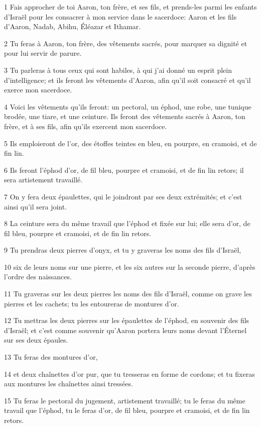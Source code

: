 \par 1 Fais approcher de toi Aaron, ton frère, et ses fils, et prends-les parmi les enfants d'Israël pour les consacrer à mon service dans le sacerdoce: Aaron et les fils d'Aaron, Nadab, Abihu, Éléazar et Ithamar.
\par 2 Tu feras à Aaron, ton frère, des vêtements sacrés, pour marquer sa dignité et pour lui servir de parure.
\par 3 Tu parleras à tous ceux qui sont habiles, à qui j'ai donné un esprit plein d'intelligence; et ils feront les vêtements d'Aaron, afin qu'il soit consacré et qu'il exerce mon sacerdoce.
\par 4 Voici les vêtements qu'ils feront: un pectoral, un éphod, une robe, une tunique brodée, une tiare, et une ceinture. Ils feront des vêtements sacrés à Aaron, ton frère, et à ses fils, afin qu'ils exercent mon sacerdoce.
\par 5 Ils emploieront de l'or, des étoffes teintes en bleu, en pourpre, en cramoisi, et de fin lin.
\par 6 Ils feront l'éphod d'or, de fil bleu, pourpre et cramoisi, et de fin lin retors; il sera artistement travaillé.
\par 7 On y fera deux épaulettes, qui le joindront par ses deux extrémités; et c'est ainsi qu'il sera joint.
\par 8 La ceinture sera du même travail que l'éphod et fixée sur lui; elle sera d'or, de fil bleu, pourpre et cramoisi, et de fin lin retors.
\par 9 Tu prendras deux pierres d'onyx, et tu y graveras les noms des fils d'Israël,
\par 10 six de leurs noms sur une pierre, et les six autres sur la seconde pierre, d'après l'ordre des naissances.
\par 11 Tu graveras sur les deux pierres les noms des fils d'Israël, comme on grave les pierres et les cachets; tu les entoureras de montures d'or.
\par 12 Tu mettras les deux pierres sur les épaulettes de l'éphod, en souvenir des fils d'Israël; et c'est comme souvenir qu'Aaron portera leurs noms devant l'Éternel sur ses deux épaules.
\par 13 Tu feras des montures d'or,
\par 14 et deux chaînettes d'or pur, que tu tresseras en forme de cordons; et tu fixeras aux montures les chaînettes ainsi tressées.
\par 15 Tu feras le pectoral du jugement, artistement travaillé; tu le feras du même travail que l'éphod, tu le feras d'or, de fil bleu, pourpre et cramoisi, et de fin lin retors.
